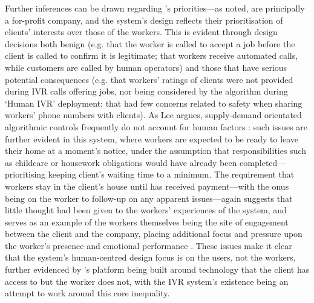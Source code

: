 Further inferences can be drawn regarding \PC's priorities---as noted, \PC{} are principally a for-profit company, and the system's design reflects their prioritisation of clients' interests over those of the workers. This is evident through design decisions both benign (e.g. that the worker is called to accept a job before the client is called to confirm it is legitimate; that workers receive automated calls, while customers are called by human operators) and those that have serious potential consequences (e.g. that workers' ratings of clients were not provided during IVR calls offering jobs, nor being considered by the algorithm during `Human IVR' deployment; that \PC{} had few concerns related to safety when sharing workers' phone numbers with clients). As Lee argues, supply-demand orientated algorithmic controls frequently do not account for human factors \citep{lee2015}: such issues are further evident in this system, where workers are expected to be ready to leave their home at a moment's notice, under the assumption that responsibilities such as childcare or housework obligations would have already been completed---prioritising keeping client's waiting time to a minimum. The requirement that workers stay in the client's house until \PC{} has received payment---with the onus being on the worker to follow-up on any apparent issues---again suggests that little thought had been given to the workers' experiences of the system, and serves as an example of the workers themselves being the site of engagement between the client and the company, placing additional focus and pressure upon the worker's presence and emotional performance \cite{raval2016}. These issues make it clear that the system's human-centred design focus is on the users, not the workers, further evidenced by \PC{}'s platform being built around technology that the client has access to but the worker does not, with the IVR system's existence being an attempt to work around this core inequality.

